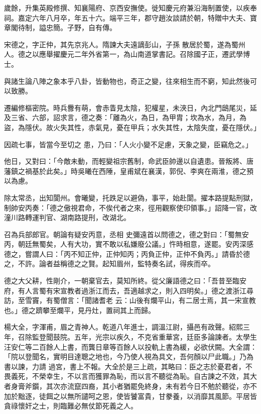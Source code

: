 \begin{pinyinscope}
 歲餘，升集英殿修撰、知襄陽府、京西安撫使。徙知慶元府兼沿海制置使，以疾奉祠。嘉定六年八月卒，年五十六。端平三年，郡守趙汝談請於朝，特贈中大夫、寶章閣待制，謚忠簡。子野，自有傳。



 宋德之，字正仲，其先京兆人。隋諫大夫遠謫彭山，子孫
 散居於蜀，遂為蜀州人。德之以應舉擢慶元二年外省第一，為山南道掌書記。召除國子正，遷武學博士。



 與諸生論八陣之象本乎八卦，皆動物也，奇正之變，往來相生而不窮，知此然後可以致勝。



 遷編修樞密院。時兵釁有萌，會赤眚見太陰，犯權星，未浹日，內北門鴟尾災，延及三省、六部，詔求言，德之奏：「離為火，為日，為甲胄；坎為水，為月，為盜，為隱伏。故火失其性，赤氣見，憂在甲兵；水失其性，太陰失度，憂在隱伏。」



 因疏七事，皆當今至切之
 患，乃曰：「人火小變不足慮，天象之變，臣竊危之。」



 他日，又對曰：「今敵未動，而輕變祖宗舊制，命武臣帥邊以自遺患。晉叛將、唐藩鎮之禍基於此矣。」時吳曦在西陲，皇甫斌在襄漢，郭倪、李爽在兩淮，德之預以為慮。



 除太常丞，出知閬州。會曦變，托跌足以避偽，事平，始赴閬。擢本路提點刑獄，制帥安丙奏：「德之傲視君命，不俟代者之來，徑用觀察使印領事。」詔降一官，改潼川路轉運判官、湖南路提刑，改湖北。



 召為兵部郎官。朝論有疑安丙意，丞相
 史彌遠首以問德之，德之對曰：「蜀無安丙，朝廷無蜀矣，人有大功，實不敢以私嫌廢公議。」忤時相意，遂罷。安丙深感德之，嘗謂人曰：「丙不知正仲，正仲知丙；丙負正仲，正仲不負丙。」請昏於德之，不許。論者益稱德之之賢。起知眉州，監特奏名試，得疾而卒。



 德之大父耕，性剛介，一朝棄官去，莫知所終。從父廉語德之曰：「吾昔至臨安府，有人言蜀有宋宣教者過浙江而去，吾適越求之，則入四明矣。」德之渡浙江尋訪，至雪竇，有蜀僧言：「聞諸耆老
 云：山後有爛平山，有二居士焉，其一宋宣教也。」德之躋攀至爛平，見丹灶，置祠其上而歸。



 楊大全，字渾甫，眉之青神人。乾道八年進士，調溫江尉，攝邑有政聲。紹熙三年，召除監登聞鼓院。五年，光宗以疾久，不克省重華宮，廷臣多論諫者。太學生汪安仁等二百餘人上書，而龔日章等百餘人以投軌上書為緩，必欲伏闕。大全謂：「院以登聞名，實明目達聰之地也，今乃使人視為具文，吾何顏以尸此職。」乃為書以諫，力請
 過宮，書上不報。大全於是三上疏，其略曰：臣之志於憂君者，不畏義死，不榮幸生，不以言而獲罪為恥，而以言不聽從為恥。自古諫之不效，其大者身膏斧鑕，其次亦流竄四裔，其小者猶罷免終身，未有若今日不勉於聽從，亦不加於黜逐，徒餌之以無所譴呵之恩，使皆饕富貴，甘豢養，以消靡其風節。平居皆貪祿懷奸之士，則臨難必無仗節死義之人。




\end{pinyinscope}
